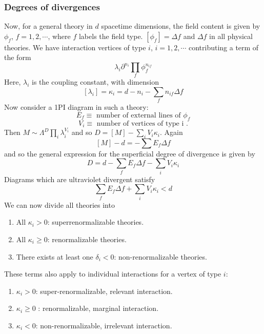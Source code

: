 \documentclass[cyan]{elegantnote}
\begin{document}
\subsubsection{Degrees of divergences}
Now, for a general theory in $d$ spacetime dimensions, the field content is given by $\phi_f$, $f=1,2,\cdots$, where $f$ labels
the field type. $[\phi_f]=\Delta f$ and $\Delta f$ in all physical theories. We have interaction vertices of type $i$, $i = 1,2,\cdots$
contributing a term of the form
\[\lambda_i \partial^{n_i} \prod_f \phi_f^{n_{if}}\]
Here, $\lambda_i$ is the coupling constant, with dimension
\[[\lambda_i] = \kappa_i = d - n_i - \sum_f n_{if}\Delta f \]
Now consider a 1PI diagram in such a theory:
\[E_f \equiv \mbox{ number of external lines of } \phi_f\]
\[V_i \equiv \mbox{ number of vertices of type i }.\]
Then $M \sim \Lambda^D \prod_i \lambda_i ^{V_i}$ and so $D = [M] - \sum_i V_i \kappa_i$. Again
\[[M] - d = -\sum E_f \Delta f\]
and so the general expression for the superficial degree of divergence is given by
\[D = d - \sum_f E_f \Delta f - \sum_i V_i \kappa_i\]
Diagrams which are ultraviolet divergent satisfy
\[\sum_f E_f \Delta f + \sum_i V_i \kappa_i < d\]
We can now divide all theories into
\begin{enumerate}
\item All $\kappa_i > 0$: superrenormalizable theories.
\item All $\kappa_i \geq 0$: renormalizable theories.
\item There exists at least one $\delta_i < 0$: non-renormalizable theories.
\end{enumerate}
These terms also apply to individual interactions for a vertex of type $i$:
\begin{enumerate}
\item $\kappa_i > 0$: super-renormalizable, relevant interaction.
\item $\kappa_i \geq 0$ : renormalizable, marginal interaction.
\item $\kappa_i < 0$: non-renormalizable, irrelevant interaction.
\end{enumerate}
\end{document}
